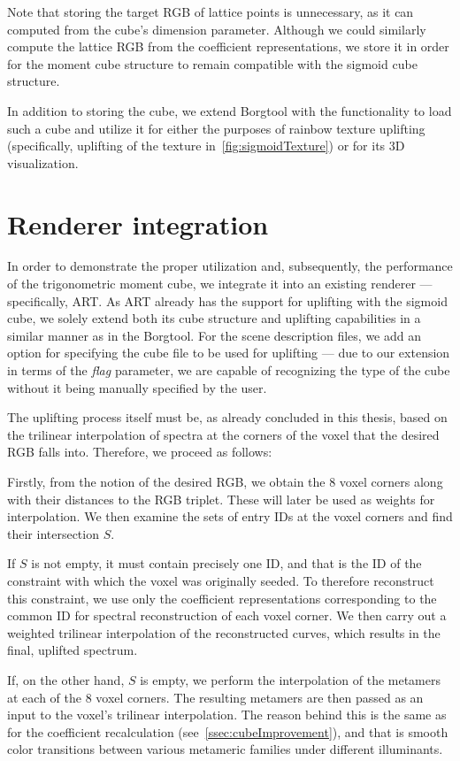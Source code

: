 Note that storing the target RGB of lattice points is unnecessary, as it can computed from the cube's dimension parameter. Although we could similarly compute the lattice RGB from the coefficient representations, we store it in order for the moment cube structure to remain compatible with the sigmoid cube structure. 

In addition to storing the cube, we extend Borgtool with the functionality to load such a cube and utilize it for either the purposes of rainbow texture uplifting (specifically, uplifting of the texture in~\cref{fig:sigmoidTexture}) or for its 3D visualization.

\section{Renderer integration} \label{sec:rendererIntegration}

In order to demonstrate the proper utilization and, subsequently, the performance of the trigonometric moment cube, we integrate it into an existing renderer --- specifically, ART. As ART already has the support for uplifting with the sigmoid cube, we solely extend both its cube structure and uplifting capabilities in a similar manner as in the Borgtool. For the scene description files, we add an option for specifying the cube file to be used for uplifting --- due to our extension in terms of the \emph{flag} parameter, we are capable of recognizing the type of the cube without it being manually specified by the user.

The uplifting process itself must be, as already concluded in this thesis, based on the trilinear interpolation of spectra at the corners of the voxel that the desired RGB falls into. Therefore, we proceed as follows:

Firstly, from the notion of the desired RGB, we obtain the 8 voxel corners along with their distances to the RGB triplet. These will later be used as weights for interpolation. We then examine the sets of entry IDs at the voxel corners and find their intersection $S$.

If $S$ is not empty, it must contain precisely one ID, and that is the ID of the constraint with which the voxel was originally seeded. To therefore reconstruct this constraint, we use only the coefficient representations corresponding to the common ID for spectral reconstruction of each voxel corner. We then carry out a weighted trilinear interpolation of the reconstructed curves, which results in the final, uplifted spectrum.

If, on the other hand, $S$ is empty, we perform the interpolation of the metamers at each of the 8 voxel corners. The resulting metamers are then passed as an input to the voxel's trilinear interpolation. The reason behind this is the same as for the coefficient recalculation (see~\cref{ssec:cubeImprovement}), and that is smooth color transitions between various metameric families under different illuminants.